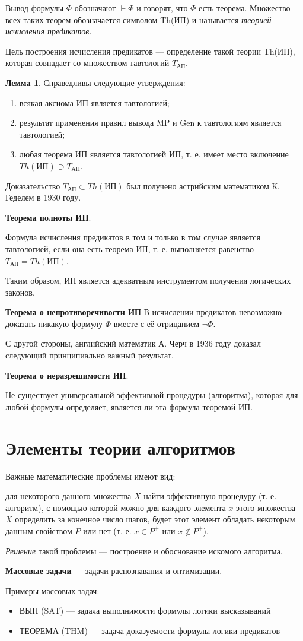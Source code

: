 Вывод формулы $\Phi$ обозначают $\vdash \Phi$ и говорят, что $\Phi$ есть теорема. Множество всех таких теорем обозначается символом Th(ИП) и называется \textit{теорией исчисления предикатов}.

Цель построения исчисления предикатов --- определение такой теории Th(ИП), которая совпадает со множеством тавтологий $T_{\text{АП}}$.

\textbf{Лемма 1}.
Справедливы следующие утверждения:
\begin{enumerate}
    \item всякая аксиома ИП является тавтологией;
    \item результат применения правил вывода MP и Gen к тавтологиям является тавтологией;
    \item любая теорема ИП является тавтологией ИП, т. е. имеет место включение $Th(\text{ИП}) \supset T_{\text{АП}}$.
\end{enumerate}

Доказательство $T_{\text{АП}} \subset Th(\text{ИП})$ был получено астрийским математиком К. Геделем в 1930 году.

\textbf{Теорема полноты ИП}.

Формула исчисления предикатов в том и только в том случае является тавтологией, если она есть теорема ИП, т. е. выполняется равенство $T_{\text{АП}}=Th(\text{ИП})$.

Таким образом, ИП является адекватным инструментом получения логических законов.

\textbf{Теорема о непротиворечивости ИП}
В исчислении предикатов невозможно доказать никакую формулу $\Phi$ вместе с её отрицанием $\lnot \Phi$.

С другой стороны, английский математик А. Черч в 1936 году доказал следующий принципиально важный результат.

\textbf{Теорема о неразрешимости ИП}.

Не существует универсальной эффективной процедуры (алгоритма), которая для любой формулы определяет, является ли эта формула теоремой ИП.

\section{Элементы теории алгоритмов}
Важные математические проблемы имеют вид:

для некоторого данного множества $X$ найти эффективную процедуру (т. е. алгоритм), с помощью которой можно для каждого элемента $x$ этого множества $X$ определить за конечное число шагов, будет этот элемент обладать некоторым данным свойством $P$ или нет (т. е. $x \in P^+$ или $x \not\in P^+$).

\textit{Решение} такой проблемы --- построение и обоснование искомого алгоритма.

\dftion \textbf{Массовые задачи} --- задачи распознавания и оптимизации.

Примеры массовых задач:
\begin{itemize}
    \item ВЫП (SAT) --- задача выполнимости формулы логики высказываний
    \item ТЕОРЕМА (THM) --- задача доказуемости формулы логики предикатов
\end{itemize}